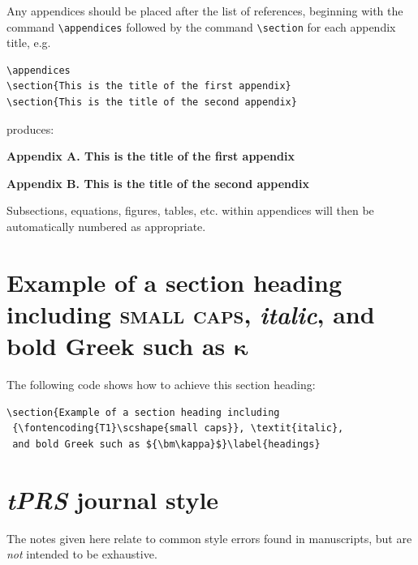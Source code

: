 \documentclass{tPRS2e}
\begin{document}
Any appendices should be placed after the list of references, beginning with the
command \verb"\appendices" followed by the command \verb"\section" for each appendix title, e.g.
\begin{verbatim}
\appendices
\section{This is the title of the first appendix}
\section{This is the title of the second appendix}
\end{verbatim}
\noindent produces:\medskip

\noindent\textbf{Appendix A. This is the title of the first appendix}\medskip

\noindent\textbf{Appendix B. This is the title of the second appendix}\medskip

\noindent Subsections, equations, figures, tables, etc. within appendices will then be automatically numbered as appropriate.


\section{Example of a section heading including {\scshape{small caps}},
   \textit{italic}, and bold Greek such as ${\bm\kappa}$}\label{headings}

The following code shows how to achieve this section heading:
\begin{verbatim}
\section{Example of a section heading including
 {\fontencoding{T1}\scshape{small caps}}, \textit{italic},
 and bold Greek such as ${\bm\kappa}$}\label{headings}
\end{verbatim}


\section{\textit{tPRS} journal style}

The notes given here relate to common style errors found in manuscripts, but are \emph{not} intended to be exhaustive.
\end{document}
